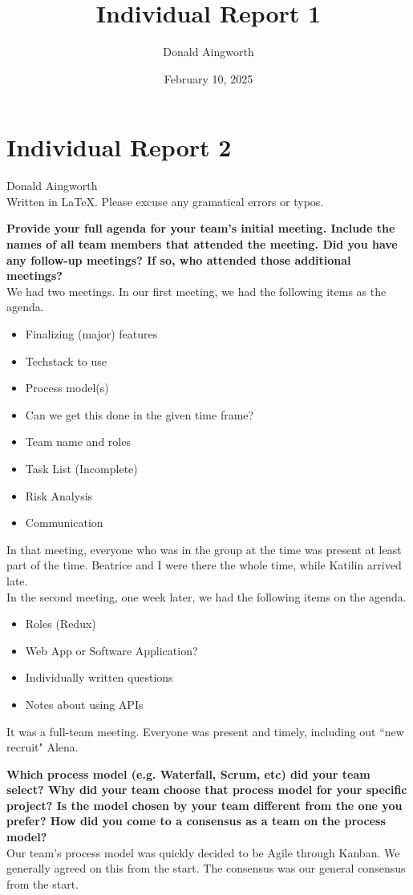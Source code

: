 \documentclass[10pt]{article}
\title{Individual Report 1}
\author{Donald Aingworth}
\date{February 10, 2025}
\begin{document}
\section*{Individual Report 2}
Donald Aingworth\\
Written in \LaTeX. Please excuse any gramatical errors or typos. 

\textbf{Provide your full agenda for your team's initial meeting. Include the names of all team members that attended the meeting. Did you have any follow-up meetings? If so, who attended those additional meetings?}\\
We had two meetings. In our first meeting, we had the following items as the agenda.
\begin{itemize}
    \item Finalizing (major) features
    \item Techstack to use
    \item Process model(s)
    \item Can we get this done in the given time frame?
    \item Team name and roles
    \item Task List (Incomplete)
    \item Risk Analysis
    \item Communication
\end{itemize}
In that meeting, everyone who was in the group at the time was present at least part of the time. Beatrice and I were there the whole time, while Katilin arrived late.\\
In the second meeting, one week later, we had the following items on the agenda.
\begin{itemize}
    \item Roles (Redux)
    \item Web App or Software Application?
    \item Individually written questions
    \item Notes about using APIs
\end{itemize}
It was a full-team meeting. Everyone was present and timely, including out ``new recruit" Alena.

\textbf{Which process model (e.g. Waterfall, Scrum, etc)  did your team select? Why did your team choose that process model for your specific project? Is the model chosen by your team different from the one you prefer? How did you come to a consensus as a team on the process model?}\\
Our team's process model was quickly decided to be Agile through Kanban. We generally agreed on this from the start. The consensus was our general consensus from the start. 
\end{document}
